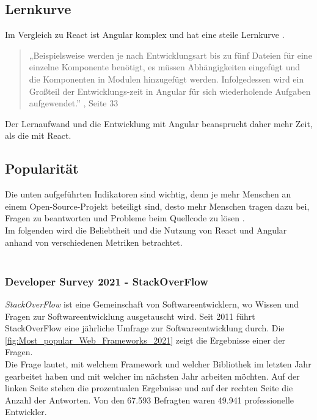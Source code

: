\subsection{Lernkurve}
Im Vergleich zu React ist Angular komplex und hat eine steile Lernkurve {\cite{E01}}.
\begin{quote}
  „Beispielsweise werden je nach Entwicklungsart bis zu fünf Dateien für eine einzelne Komponente benötigt, es müssen Abhängigkeiten eingefügt und die Komponenten in Modulen hinzugefügt werden. Infolgedessen wird ein Großteil der Entwicklungs-zeit in Angular für sich wiederholende Aufgaben aufgewendet.”
  {, Seite 33\cite{AN1}}
\end{quote}
Der Lernaufwand und die Entwicklung mit Angular beansprucht daher mehr Zeit, als die mit React.

\subsection{Popularität}
Die unten aufgeführten Indikatoren sind wichtig, denn je mehr Menschen an einem Open-Source-Projekt beteiligt sind, desto mehr Menschen tragen dazu bei, Fragen zu beantworten und Probleme beim Quellcode zu lösen {\cite{LIN1}}.
\\
Im folgenden wird die Beliebtheit und die Nutzung von React und Angular anhand von verschiedenen Metriken betrachtet.
\\\\
\subsubsection*{Developer Survey 2021 - StackOverFlow}
\textit{StackOverFlow} ist eine Gemeinschaft von Softwareentwicklern, wo Wissen und Fragen zur Softwareentwicklung ausgetauscht wird. Seit 2011 führt StackOverFlow eine jährliche Umfrage zur Softwareentwicklung durch.
Die \autoref{fig:Most_popular_Web_Frameworks_2021} zeigt die Ergebnisse einer der Fragen. \\
Die Frage lautet, mit welchem Framework und welcher Bibliothek im letzten Jahr gearbeitet haben und mit welcher im nächsten Jahr arbeiten möchten. Auf der linken Seite stehen die prozentualen Ergebnisse und auf der rechten Seite die Anzahl der Antworten. Von den 67.593 Befragten waren 49.941 professionelle Entwickler. 
  

